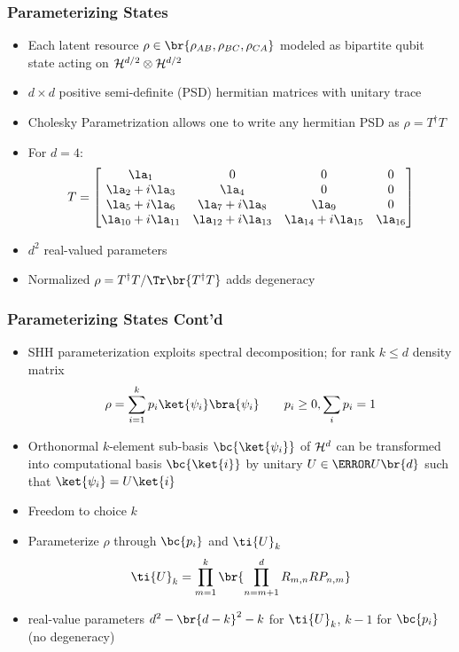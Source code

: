 \documentclass[
    hyperref={bookmarks=false},%
    xcolor={dvipsnames},
]{beamer}
\renewcommand{\term}[1]{\textcolor{Mahogany}{#1}}
\begin{document}
\begin{frame}
    \frametitle{Parameterizing States}
    \begin{itemize}
        \item Each latent resource $\rho \in \br{\rho_{AB}, \rho_{BC}, \rho_{CA}}$ modeled as bipartite qubit state acting on $\mathcal{H}^{d/2} \otimes \mathcal{H}^{d/2}$
        \item $d \times d$ positive semi-definite (PSD) hermitian matrices with unitary trace
        \item \term{Cholesky Parametrization} allows one to write any hermitian PSD as $\rho = T^{\dagger} T$
        \item For $d = 4$:
        \[ T = \begin{bmatrix}\la_{1}&0&0&0\\\la_{2} + i \la_{3}&\la_{4}&0&0\\\la_{5} + i \la_{6}&\la_{7} + i \la_{8}&\la_{9}&0\\\la_{10} + i \la_{11}&\la_{12} + i \la_{13}&\la_{14} + i \la_{15}&\la_{16}\end{bmatrix} \]
        \item $d^2$ real-valued parameters
        \item Normalized $\rho = {T^{\dagger}T}/{\Tr\br{T^{\dagger} T}}$ adds degeneracy
    \end{itemize}
\end{frame}

\begin{frame}
    \frametitle{Parameterizing States Cont'd}
    \begin{itemize}
        \item \term{SHH parameterization} \cite{Spengler_2010_Unitary} exploits spectral decomposition; for rank $k \leq d$ density matrix
        \[ \rho = \sum_{i=1}^{k} p_i \ket{\psi_i} \bra{\psi_i} \qquad p_i \geq 0, \sum_i p_i = 1 \]
        \item Orthonormal $k$-element sub-basis $\bc{\ket{\psi_i}}$ of $\mathcal{H}^d$ can be transformed into computational basis $\bc{\ket{i}}$ by unitary $U \in \s{U}\br{d}$ such that $\ket{\psi_i} = U \ket{i}$
        \item Freedom to choice $k$
        \item Parameterize $\rho$ through $\bc{p_i}$ and $\ti{U}_{k}$
        \[ \ti{U}_{k} = \prod_{m=1}^{k} \br{\prod_{n={m+1}}^{d} R_{m,n} RP_{n,m}} \]
        \item real-value parameters $d^2 - \br{d-k}^2 - k$ for $\ti{U}_{k}$, $k-1$ for $\bc{p_i}$ (no degeneracy)
    \end{itemize}
\end{frame}
\end{document}
